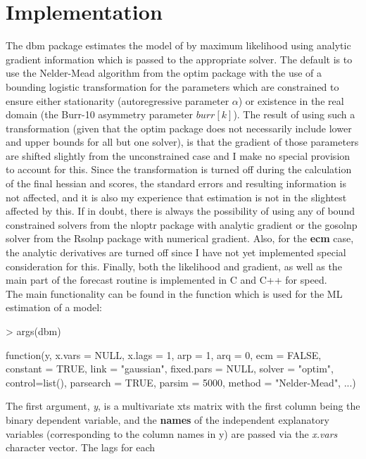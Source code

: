 \section{Implementation}\label{sec:implementation}
The dbm package estimates the model of \cite{Kauppi2008} by maximum likelihood using analytic gradient information which is passed to the appropriate solver.
The default is to use the Nelder-Mead algorithm from the optim package with the use of a bounding logistic transformation for the parameters which are constrained
to ensure either stationarity (autoregressive parameter $\alpha$) or existence in the real domain (the Burr-10 asymmetry parameter $burr[k]$). The result of
using such a transformation (given that the optim package does not necessarily include lower and upper bounds for all but one solver), is that the gradient of
those parameters are shifted slightly from the unconstrained case and I make no special provision to account for this. Since the transformation is turned off
during the calculation of the final hessian and scores, the standard errors and resulting information is not affected, and it is also my experience that
estimation is not in the slightest affected by this. If in doubt, there is always the possibility of using any of bound constrained solvers from the nloptr package
with analytic gradient or the gosolnp solver from the Rsolnp package with numerical gradient. Also, for the \textbf{ecm} case, the analytic derivatives are turned
off since I have not yet implemented special consideration for this. Finally, both the likelihood and gradient, as well as the main part of the forecast routine is
implemented in C and C++ for speed.\\
The main functionality can be found in the \verb@dbm@ function which is used for the ML estimation of a model:
\begin{Schunk}
\begin{Sinput}
> args(dbm)
\end{Sinput}
\begin{Soutput}
function(y, x.vars = NULL, x.lags = 1, arp = 1, arq = 0, ecm = FALSE,
	constant = TRUE, link = "gaussian", fixed.pars = NULL,
	solver = "optim", control=list(), parsearch = TRUE, parsim = 5000,
	method = "Nelder-Mead", ...)
\end{Soutput}
\end{Schunk}
The first argument, \emph{y}, is a multivariate xts matrix with the first column being the binary dependent variable, and the \textbf{names} of the
independent explanatory variables (corresponding to the column names in y) are passed via the \emph{x.vars} character vector. The lags for each
